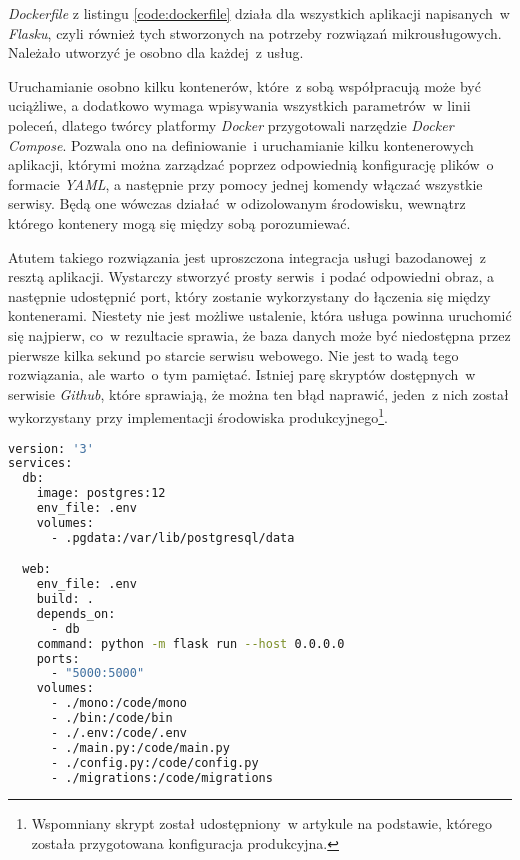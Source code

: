 \textit{Dockerfile} z listingu \ref{code:dockerfile} działa dla wszystkich aplikacji napisanych~w \textit{Flasku}, czyli również tych stworzonych na potrzeby rozwiązań mikrousługowych. Należało utworzyć je osobno dla każdej~z usług.

Uruchamianie osobno kilku kontenerów, które~z sobą współpracują może być uciążliwe, a dodatkowo wymaga wpisywania wszystkich parametrów~w linii poleceń, dlatego twórcy platformy \textit{Docker} przygotowali narzędzie \textit{Docker Compose}. Pozwala ono na definiowanie~i uruchamianie kilku kontenerowych aplikacji, którymi można zarządzać poprzez odpowiednią konfigurację plików~o formacie \textit{YAML}, a następnie przy pomocy jednej komendy włączać wszystkie serwisy\cite{docker}. Będą one wówczas działać~w odizolowanym środowisku, wewnątrz którego kontenery mogą się między sobą porozumiewać\cite{docker}.

Atutem takiego rozwiązania jest uproszczona integracja usługi bazodanowej~z resztą aplikacji. Wystarczy stworzyć prosty serwis~i podać odpowiedni obraz, a następnie udostępnić port, który zostanie wykorzystany do łączenia się między kontenerami. Niestety nie jest możliwe ustalenie, która usługa powinna uruchomić się najpierw, co~w rezultacie sprawia, że baza danych może być niedostępna przez pierwsze kilka sekund po starcie serwisu webowego. Nie jest to wadą tego rozwiązania, ale warto~o tym pamiętać. Istniej parę skryptów dostępnych~w serwisie \textit{Github}, które sprawiają, że można ten błąd naprawić, jeden~z nich został wykorzystany przy implementacji środowiska produkcyjnego\footnote{Wspomniany skrypt został udostępniony~w artykule \cite{Herman:2020} na podstawie, którego została przygotowana konfiguracja produkcyjna.}.

\begin{lstlisting}[language=Bash, caption={Plik \textit{docker-compose.yml} wykorzystany do uruchomienia aplikacji monolitycznej.}, label={code:dockercompose}]
version: '3'
services:
  db:
    image: postgres:12
    env_file: .env
    volumes:
      - .pgdata:/var/lib/postgresql/data

  web:
    env_file: .env
    build: .
    depends_on:
      - db
    command: python -m flask run --host 0.0.0.0
    ports:
      - "5000:5000"
    volumes:
      - ./mono:/code/mono
      - ./bin:/code/bin
      - ./.env:/code/.env
      - ./main.py:/code/main.py
      - ./config.py:/code/config.py
      - ./migrations:/code/migrations
\end{lstlisting}

